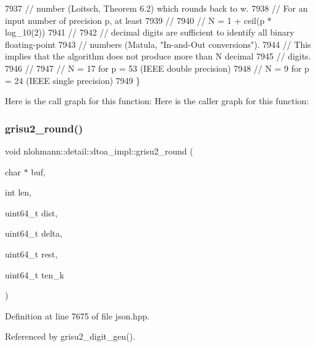 \begin{DoxyCode}
7937     \textcolor{comment}{// number (Loitsch, Theorem 6.2) which rounds back to w.}
7938     \textcolor{comment}{// For an input number of precision p, at least}
7939     \textcolor{comment}{//}
7940     \textcolor{comment}{//      N = 1 + ceil(p * log\_10(2))}
7941     \textcolor{comment}{//}
7942     \textcolor{comment}{// decimal digits are sufficient to identify all binary floating-point}
7943     \textcolor{comment}{// numbers (Matula, "In-and-Out conversions").}
7944     \textcolor{comment}{// This implies that the algorithm does not produce more than N decimal}
7945     \textcolor{comment}{// digits.}
7946     \textcolor{comment}{//}
7947     \textcolor{comment}{//      N = 17 for p = 53 (IEEE double precision)}
7948     \textcolor{comment}{//      N = 9  for p = 24 (IEEE single precision)}
7949 \}
\end{DoxyCode}
Here is the call graph for this function\+:
Here is the caller graph for this function\+:
\mbox{\label{namespacenlohmann_1_1detail_1_1dtoa__impl_a9e66e6d0f072aa4fc0627bffc5b1cbd8}} 
\subsubsection{\texorpdfstring{grisu2\+\_\+round()}{grisu2\_round()}}
{\footnotesize\ttfamily void nlohmann\+::detail\+::dtoa\+\_\+impl\+::grisu2\+\_\+round (\begin{DoxyParamCaption}\item[{char $\ast$}]{buf,  }\item[{int}]{len,  }\item[{uint64\+\_\+t}]{dist,  }\item[{uint64\+\_\+t}]{delta,  }\item[{uint64\+\_\+t}]{rest,  }\item[{uint64\+\_\+t}]{ten\+\_\+k }\end{DoxyParamCaption})\hspace{0.3cm}{\ttfamily [inline]}}



Definition at line 7675 of file json.\+hpp.



Referenced by grisu2\+\_\+digit\+\_\+gen().


